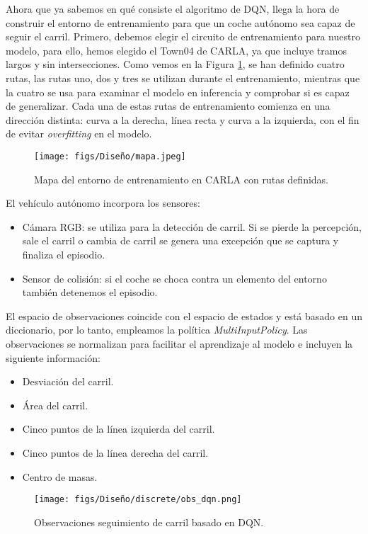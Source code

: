 Ahora que ya sabemos en qué consiste el algoritmo de \ac{DQN}, llega la hora de construir el entorno de entrenamiento para que un coche autónomo sea capaz de seguir el carril. Primero, debemos elegir el circuito de entrenamiento para nuestro modelo, para ello, hemos elegido el Town04 de CARLA, ya que incluye tramos largos y sin intersecciones. Como vemos en la Figura \ref{fig:mapa}, se han definido cuatro rutas, las rutas uno, dos y tres se utilizan durante el entrenamiento, mientras que la cuatro se usa para examinar el modelo en inferencia y comprobar si es capaz de generalizar. Cada una de estas rutas de entrenamiento comienza en una dirección distinta: curva a la derecha, línea recta y curva a la izquierda, con el fin de evitar \textit{overfitting} en el modelo.

\begin{figure}[ht]
  \centering
  \texttt{[image: figs/Diseño/mapa.jpeg]}
  \caption{Mapa del entorno de entrenamiento en CARLA con rutas definidas.}
  \label{fig:mapa}
\end{figure}

\newpage

El vehículo autónomo incorpora los sensores:
\begin{itemize}
		\item Cámara RGB: se utiliza para la detección de carril. Si se pierde la percepción, sale el carril o cambia de carril se genera una excepción que se captura y finaliza el episodio.
		\item Sensor de colisión: si el coche se choca contra un elemento del entorno también detenemos el episodio.
\end{itemize}

El espacio de observaciones coincide con el espacio de estados y está basado en un diccionario, por lo tanto, empleamos la política \textit{MultiInputPolicy}. Las observaciones se normalizan para facilitar el aprendizaje al modelo e incluyen la siguiente información: 
\begin{itemize}
		\item Desviación del carril.
		\item Área del carril.
		\item Cinco puntos de la línea izquierda del carril.
		\item Cinco puntos de la línea derecha del carril.
		\item Centro de masas.
\end{itemize}

\begin{figure}[ht]
  \centering
  \texttt{[image: figs/Diseño/discrete/obs\_dqn.png]}
  \caption{Observaciones seguimiento de carril basado en \ac{DQN}.}
  \label{fig:dqn_obs}
\end{figure}


